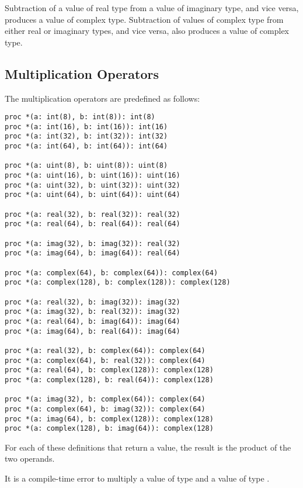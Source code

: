 Subtraction of a value of real type from a value of imaginary type,
and vice versa, produces a value of complex type.  Subtraction of
values of complex type from either real or imaginary types, and vice
versa, also produces a value of complex type.

\pagebreak
\subsection{Multiplication Operators}
\label{Multiplication_Operators}

The multiplication operators are predefined as follows:
\begin{chapel}
\begin{verbatim}
proc *(a: int(8), b: int(8)): int(8)
proc *(a: int(16), b: int(16)): int(16)
proc *(a: int(32), b: int(32)): int(32)
proc *(a: int(64), b: int(64)): int(64)

proc *(a: uint(8), b: uint(8)): uint(8)
proc *(a: uint(16), b: uint(16)): uint(16)
proc *(a: uint(32), b: uint(32)): uint(32)
proc *(a: uint(64), b: uint(64)): uint(64)

proc *(a: real(32), b: real(32)): real(32)
proc *(a: real(64), b: real(64)): real(64)

proc *(a: imag(32), b: imag(32)): real(32)
proc *(a: imag(64), b: imag(64)): real(64)

proc *(a: complex(64), b: complex(64)): complex(64)
proc *(a: complex(128), b: complex(128)): complex(128)

proc *(a: real(32), b: imag(32)): imag(32)
proc *(a: imag(32), b: real(32)): imag(32)
proc *(a: real(64), b: imag(64)): imag(64)
proc *(a: imag(64), b: real(64)): imag(64)

proc *(a: real(32), b: complex(64)): complex(64)
proc *(a: complex(64), b: real(32)): complex(64)
proc *(a: real(64), b: complex(128)): complex(128)
proc *(a: complex(128), b: real(64)): complex(128)

proc *(a: imag(32), b: complex(64)): complex(64)
proc *(a: complex(64), b: imag(32)): complex(64)
proc *(a: imag(64), b: complex(128)): complex(128)
proc *(a: complex(128), b: imag(64)): complex(128)
\end{verbatim}
\end{chapel}
For each of these definitions that return a value, the result is the
product of the two operands.

It is a compile-time error to multiply a value of type  and
a value of type .

